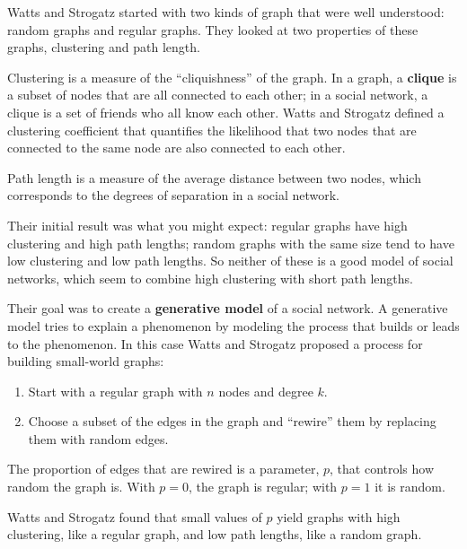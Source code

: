 \documentclass[10pt]{book}
\begin{document}
Watts and Strogatz started with two kinds of graph that were well
understood: random graphs and regular graphs.  They looked at two
properties of these graphs, clustering and path length.

\begin{description}

\item Clustering is a measure of the ``cliquishness'' of the graph.
In a graph, a {\bf clique} is a subset of nodes that are
all connected to each other; in a social network, a clique is
a set of friends who all know each other.  Watts and Strogatz
defined a clustering coefficient that quantifies the likelihood
that two nodes that are connected to the same node are also
connected to each other.

\item Path length is a measure of the average distance between
two nodes, which corresponds to the degrees of separation in
a social network.

\end{description}

Their initial result was what you might expect: regular graphs
have high clustering and high path lengths;
random graphs with the same size tend to have low clustering
and low path lengths.  So neither of these is a good model of
social networks, which seem to combine high clustering with
short path lengths.

Their goal was to create a {\bf generative model} of a social
network.  A generative model tries to explain a phenomenon by
modeling the process that builds or leads to the phenomenon.  In
this case Watts and Strogatz proposed a process for building
small-world graphs:

\begin{enumerate}

\item Start with a regular graph with $n$ nodes and degree $k$.

\item Choose a subset of the edges in the graph and ``rewire''
them by replacing them with random edges.

\end{enumerate}

The proportion of edges that are rewired is a parameter, $p$,
that controls how random the graph is.  With $p=0$, the graph
is regular; with $p=1$ it is random.

Watts and Strogatz found that small values of $p$ yield graphs
with high clustering, like a regular graph, and low path
lengths, like a random graph.
\end{document}
